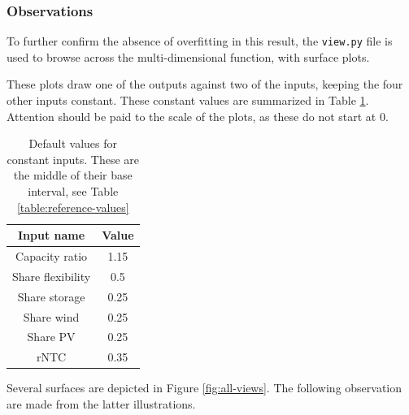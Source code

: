 \subsubsection{Observations \label{ssec:surrogate-model-surf-observations}}

To further confirm the absence of overfitting in this result, the \texttt{view.py} file is used to browse across the multi-dimensional function, with surface plots.

These plots draw one of the outputs against two of the inputs, keeping the four other inputs constant. These constant values are summarized in Table \ref{tab:default-view-values}. Attention should be paid to the scale of the plots, as these do not start at 0.

\begin{table}[h!]
    \centering
    \begin{tabular}{|c|c|}
        \hline
        Input name & Value \\ \hline
        Capacity ratio & 1.15 \\
        Share flexibility & 0.5 \\
        Share storage & 0.25 \\
        Share wind & 0.25 \\
        Share PV & 0.25 \\
        rNTC & 0.35 \\ \hline
    \end{tabular}
    \caption{Default values for constant inputs. These are the middle of their base interval, see Table \ref{table:reference-values}}
    \label{tab:default-view-values}
\end{table}

Several surfaces are depicted in Figure \ref{fig:all-views}. The following observation are made from the latter illustrations.

